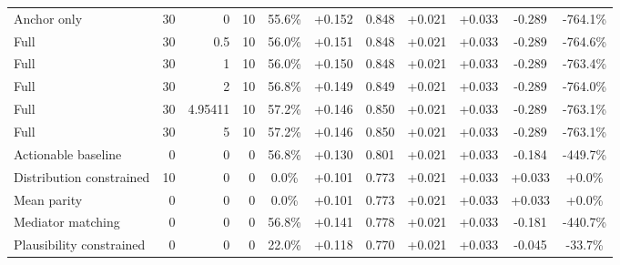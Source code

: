 \begin{table}[htbp]
\begin{tabular}{lrrrccccccc}
Anchor only & 30 & 0 & 10 & 55.6\% & +0.152 & 0.848 & +0.021 & +0.033 & -0.289 & -764.1\% \\
Full & 30 & 0.5 & 10 & 56.0\% & +0.151 & 0.848 & +0.021 & +0.033 & -0.289 & -764.6\% \\
Full & 30 & 1 & 10 & 56.0\% & +0.150 & 0.848 & +0.021 & +0.033 & -0.289 & -763.4\% \\
Full & 30 & 2 & 10 & 56.8\% & +0.149 & 0.849 & +0.021 & +0.033 & -0.289 & -764.0\% \\
Full & 30 & 4.95411 & 10 & 57.2\% & +0.146 & 0.850 & +0.021 & +0.033 & -0.289 & -763.1\% \\
Full & 30 & 5 & 10 & 57.2\% & +0.146 & 0.850 & +0.021 & +0.033 & -0.289 & -763.1\% \\
Actionable baseline & 0 & 0 & 0 & 56.8\% & +0.130 & 0.801 & +0.021 & +0.033 & -0.184 & -449.7\% \\
Distribution constrained & 10 & 0 & 0 & 0.0\% & +0.101 & 0.773 & +0.021 & +0.033 & +0.033 & +0.0\% \\
Mean parity & 0 & 0 & 0 & 0.0\% & +0.101 & 0.773 & +0.021 & +0.033 & +0.033 & +0.0\% \\
Mediator matching & 0 & 0 & 0 & 56.8\% & +0.141 & 0.778 & +0.021 & +0.033 & -0.181 & -440.7\% \\
Plausibility constrained & 0 & 0 & 0 & 22.0\% & +0.118 & 0.770 & +0.021 & +0.033 & -0.045 & -33.7\% \\
\bottomrule
\end{tabular}
\end{table}
